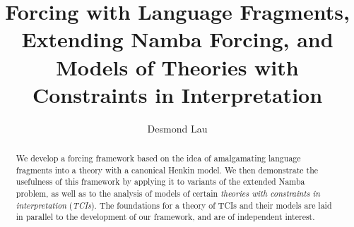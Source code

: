 \documentclass[12pt]{article}
\title{Forcing with Language Fragments, Extending Namba Forcing, and Models of Theories with Constraints in Interpretation}
\author{Desmond Lau}
\numberwithin{equation}{section}
\begin{document}
\maketitle

\begin{abstract}
    We develop a forcing framework based on the idea of amalgamating language fragments into a theory with a canonical Henkin model. We then demonstrate the usefulness of this framework by applying it to variants of the extended Namba problem, as well as to the analysis of models of certain \emph{theories with constraints in interpretation} (\emph{TCIs}). The foundations for a theory of TCIs and their models are laid in parallel to the development of our framework, and are of independent interest.
\end{abstract}

\newtheorem{thm}{Theorem}[section]
\newtheorem{lem}[thm]{Lemma}
\newtheorem{prop}[thm]{Proposition}
\newtheorem{cor}[thm]{Corollary}
\newtheorem{conj}[thm]{Conjecture}
\newtheorem{ques}[thm]{Question}
\newtheorem*{claim}{Claim}
\theoremstyle{definition}
\newtheorem{defi}[thm]{Definition}
\theoremstyle{remark}
\newtheorem*{rem*}{Remark}
\newtheorem{rem}[thm]{Remark}
\newtheorem{ex}[thm]{Example}
\newtheorem{ob}[thm]{Observation}
\newtheorem{fact}[thm]{Fact}
\newtheorem{con}[thm]{Convention}

\theoremstyle{definition}
\newtheorem{innercustomthm}{Theorem}
\newenvironment{customthm}[1]
  {\renewcommand\theinnercustomthm{#1}\innercustomthm}
  {\endinnercustomthm}

\theoremstyle{definition}
\newtheorem{innercustomlem}{Lemma}
\newenvironment{customlem}[1]
  {\renewcommand\theinnercustomlem{#1}\innercustomlem}
  {\endinnercustomlem}

\theoremstyle{definition}
\newtheorem{innercustomdef}{Definition}
\newenvironment{customdef}[1]
  {\renewcommand\theinnercustomdef{#1}\innercustomdef}
  {\endinnercustomdef}

\theoremstyle{remark}
\newtheorem{innercustomfact}{Fact}
\newenvironment{customfact}[1]
  {\renewcommand\theinnercustomfact{#1}\innercustomfact}
  {\endinnercustomfact}

\newcommand{\bd}[1]{\mathbf{#1}}  %
\newcommand{\RR}{\mathbb{R}}      %
\newcommand{\ZZ}{\mathbb{Z}}      %
\newcommand{\col}[1]{\left[\begin{matrix} #1 \end{matrix} \right]}
\newcommand{\comb}[2]{\binom{#1^2 + #2^2}{#1+#2}}
\newcommand{\eq}{=}
\end{document}
